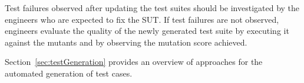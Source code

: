 Test failures observed after updating the test suites should be investigated by the engineers who are expected to fix the SUT.
If test failures are not observed, engineers evaluate the quality of the newly generated test suite by executing it against the mutants and by observing the mutation score achieved. 

Section~\ref{sec:testGeneration} provides an overview of approaches for the automated generation of test cases.






